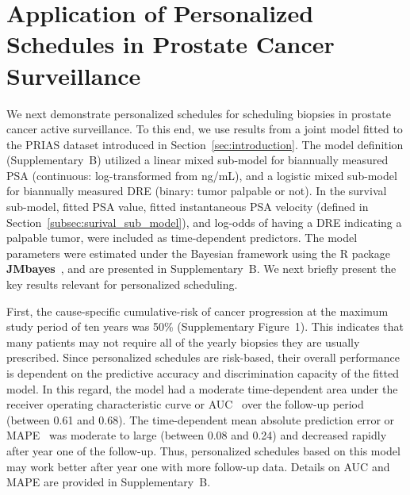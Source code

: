\section{Application of Personalized Schedules in Prostate Cancer Surveillance}
\label{sec:results}
We next demonstrate personalized schedules for scheduling biopsies in prostate cancer active surveillance. To this end, we use results from a joint model fitted to the PRIAS dataset introduced in Section~\ref{sec:introduction}. The model definition (Supplementary~B) utilized a linear mixed sub-model for biannually measured PSA (continuous: log-transformed from ng/mL), and a logistic mixed sub-model for biannually measured DRE (binary: tumor palpable or not). In the survival sub-model, fitted PSA value, fitted instantaneous PSA velocity (defined in Section~\ref{subsec:surival_sub_model}), and log-odds of having a DRE indicating a palpable tumor, were included as time-dependent predictors. The model parameters were estimated under the Bayesian framework using the R package \textbf{JMbayes}~\citep{rizopoulosJMbayes}, and are presented in Supplementary~B. We next briefly present the key results relevant for personalized scheduling.

First, the cause-specific cumulative-risk of cancer progression at the maximum study period of ten years was 50\% (Supplementary Figure~1). This indicates that many patients may not require all of the yearly biopsies they are usually prescribed. Since personalized schedules are risk-based, their overall performance is dependent on the predictive accuracy and discrimination capacity of the fitted model. In this regard, the model had a moderate time-dependent area under the receiver operating characteristic curve or AUC~\citep{landmarking2017} over the follow-up period (between 0.61 and 0.68). The time-dependent mean absolute prediction error or MAPE~\citep{landmarking2017} was moderate to large (between 0.08 and 0.24) and decreased rapidly after year one of the follow-up. Thus, personalized schedules based on this model may work better after year one with more follow-up data. Details on AUC and MAPE are provided in Supplementary~B.

